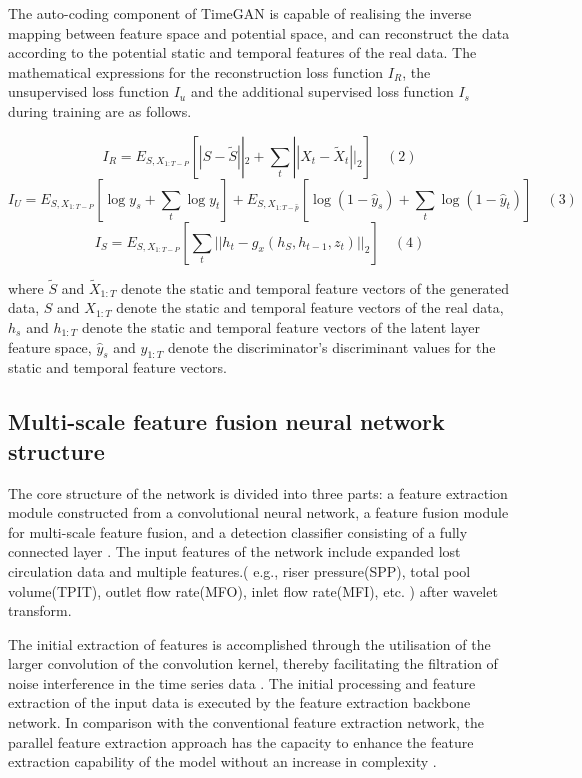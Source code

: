 \documentclass[journal,article,submit,pdftex,moreauthors]{Definitions/mdpi}
\begin{document}
The auto-coding component of TimeGAN is capable of realising the inverse mapping between feature space and potential space, and can reconstruct the data according to the potential static and temporal features of the real data. The mathematical expressions for the reconstruction loss function \({{I}_{R}}\), the unsupervised loss function \({{I}_{u}}\) and the additional supervised loss function \({{I}_{s}}\) during training are as follows.

$$ I _ { R } = E _ { S , X _ { 1: T - P } } \left[ | S - \tilde { S } | | _ { 2 } + \sum _ { t } | | X _ { t } - \tilde { X } _ { t } | | _ { 2 } \right]\quad (2)$$
$$ I _ { U } = E _ { S , X _ {1: T- P } } \left[ \log y _ { s } + \sum _ { t } \log y _ { t } \right] + E _ { S , X _ { 1: T - \widehat { p } } } \left[ \log ( 1 - \widehat { y } _ { s } ) + \sum _ { t } \log ( 1 - \widehat { y } _ { t } ) \right]\quad (3)$$
$$ I _ { S } = E _ { S , X _ { 1: T - P } } \left[ \sum _ { t } | | h _ { t } - g _ { x } ( h _ { S } , h _ { t - 1 } , z _ { t } ) | | _ { 2 } \right]\quad (4)$$

where \({{\widetilde{S}}}\) and \({{\widetilde{X}}_{1:T}}\) denote the static and temporal feature vectors of the generated data,  \({S}\) and \({X}_{1:T}\) denote the static and temporal feature vectors of the real data,  \({h}_{s}\) and  \({h}_{1:T}\) denote the static and temporal feature vectors of the latent layer feature space, \({{\widehat{y}}_{s}}\) and  \({{\widehat{y}}_{1:T}}\) denote the discriminator's discriminant values for the static and temporal feature vectors.
\subsection{Multi-scale feature fusion neural network structure }

The core structure of the network is divided into three parts: a feature extraction module constructed from a convolutional neural network, a feature fusion module for multi-scale feature fusion, and a detection classifier consisting of a fully connected layer \cite{zhaohongyu2023}. The input features of the network include expanded lost circulation data and multiple features.( e.g., riser pressure(SPP), total pool volume(TPIT), outlet flow rate(MFO), inlet flow rate(MFI), etc. ) after wavelet transform.

The initial extraction of features is accomplished through the utilisation of the larger convolution of the convolution kernel, thereby facilitating the filtration of noise interference in the time series data \cite{meizhou2024}. The initial processing and feature extraction of the input data is executed by the feature extraction backbone network. In comparison with the conventional feature extraction network, the parallel feature extraction approach has the capacity to enhance the feature extraction capability of the model without an increase in complexity\cite{lishutao2018} .
\end{document}
